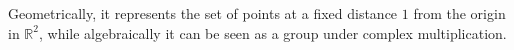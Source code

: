 \documentclass[11pt,openany]{article}
\renewcommand{\Re}{\operatorname*{Re}}
\renewcommand{\Im}{\operatorname*{Im}}
\begin{document}
Geometrically, it represents the set of points at a fixed distance \(1\) from the origin in \(\mathbb{R}^2\), while algebraically it can be seen as a group under complex multiplication.
%			
%			
\end{document}
